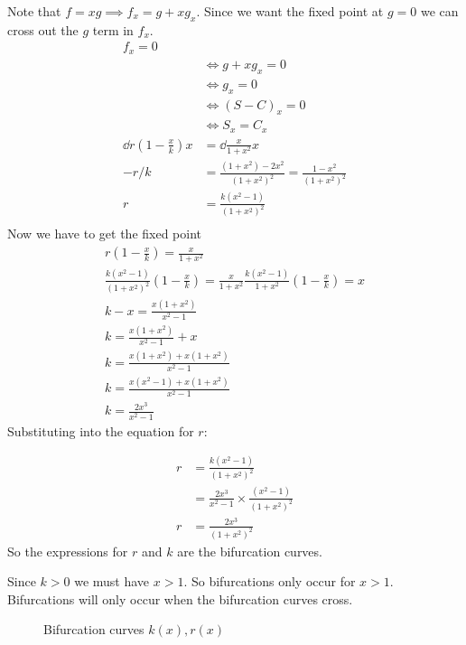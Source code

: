 \documentclass{/home/janmebows/Documents/LatexTemplates/myassignment}
\begin{document}
Note that $f=xg \implies f_x = g+xg_x$. Since we want the fixed point at $g=0$ we can cross out the $g$ term in $f_x$.
\begin{align*}
    f_x = 0\\
    &\Leftrightarrow g + xg_x = 0\\
    &\Leftrightarrow g_x = 0\\
    &\Leftrightarrow (S-C)_x= 0\\
    &\Leftrightarrow S_x=C_x\\
    \dd{r\left(1-\frac xk\right) }x &= \dd{\frac{x}{1+x^2}}x\\
    -r/k &= \frac{(1+x^2) - 2x^2}{(1+x^2)^2} = \frac{1-x^2}{(1+x^2)^2}\\
    r &= \frac{k(x^2-1)}{(1+x^2)^2}\\
\end{align*}
Now we have to get the fixed point
\begin{align*}
    r(1-\frac xk) = \frac{x}{1+x^2}\\
    \frac{k(x^2-1)}{(1+x^2)^2} (1-\frac xk) = \frac{x}{1+x^2}
    \frac{k(x^2-1)}{1+x^2} (1-\frac xk) = x\\
     k-x = \frac{x(1+x^2)}{x^2-1}\\
     k = \frac{x(1+x^2)}{x^2-1} +x\\
     k = \frac{x(1+x^2) + x(1+x^2)}{x^2-1}\\
     k = \frac{x(x^2-1) + x(1+x^2)}{x^2-1}\\
     k = \frac{2x^3}{x^2-1}
\end{align*}
Substituting into the equation for $r$:

\begin{align*}
    r &= \frac{k(x^2-1)}{(1+x^2)^2}\\
    &=\frac{2x^3}{x^2-1}\times \frac{(x^2-1)}{(1+x^2)^2}\\
    r&=\frac{2x^3}{(1+x^2)^2}
\end{align*}
So the expressions for $r$ and $k$ are the bifurcation curves.

Since $k >0$ we must have $x > 1$. So bifurcations only occur for $x >1$.
Bifurcations will only occur when the bifurcation curves cross.


\begin{figure}[h]
\centering
{}
\caption{Bifurcation curves $k(x), r(x)$}
\end{figure}
\end{document}
